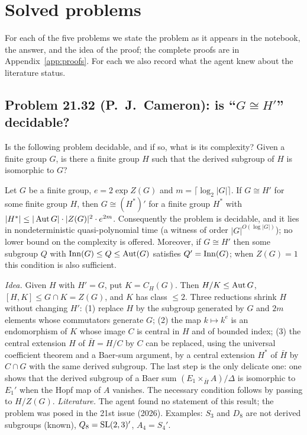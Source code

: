 \section{Solved problems}\label{sec:solved}

For each of the five problems we state the problem as it appears in the notebook, the answer, and the idea of the
proof; the complete proofs are in Appendix~\ref{app:proofs}. For each we also record what the agent knew about the
literature status.

\subsection{Problem 21.32 (P.~J.~Cameron): is ``$G\cong H'$'' decidable?}
\begin{problem}[21.32]
Is the following problem decidable, and if so, what is its complexity? Given a finite group $G$, is there a finite
group $H$ such that the derived subgroup of $H$ is isomorphic to $G$?
\end{problem}
\begin{theorem}\label{thm:2132}
Let $G$ be a finite group, $e=2\exp Z(G)$ and $m=\lceil\log_2|G|\rceil$. If $G\cong H'$ for some finite group $H$,
then $G\cong (H^*)'$ for a finite group $H^*$ with $|H^*|\le |\operatorname{Aut} G|\cdot|Z(G)|^2\cdot e^{2m}$. Consequently the
problem is decidable, and it lies in nondeterministic quasi-polynomial time (a witness of order $|G|^{O(\log|G|)}$);
no lower bound on the complexity is offered.
Moreover, if $G\cong H'$ then some subgroup $Q$ with $\operatorname{Inn}(G)\le Q\le\operatorname{Aut}(G)$ satisfies $Q'=\operatorname{Inn}(G)$; when
$Z(G)=1$ this condition is also sufficient.
\end{theorem}
\emph{Idea.} Given $H$ with $H'=G$, put $K=C_H(G)$. Then $H/K\le\operatorname{Aut} G$, $[H,K]\le G\cap K=Z(G)$, and $K$ has
class $\le 2$. Three reductions shrink $H$ without changing $H'$: (1) replace $H$ by the subgroup generated by
$G$ and $2m$ elements whose commutators generate $G$; (2) the map $k\mapsto k^e$ is an endomorphism of $K$ whose
image $C$ is central in $H$ and of bounded index; (3) the central extension $H$ of $\bar H=H/C$ by $C$ can be
replaced, using the universal coefficient theorem and a Baer-sum argument, by a central extension $H^*$ of $\bar H$
by $C\cap G$ with the same derived subgroup. The last step is the only delicate one: one shows that the derived
subgroup of a Baer sum $(E_1\times_{\bar H}A)/\Delta$ is isomorphic to $E_1'$ when the Hopf map of $A$ vanishes.
The necessary condition follows by passing to $H/Z(G)$. \emph{Literature.} The agent found no statement of this
result; the problem was posed in the 21st issue (2026). Examples: $S_3$ and $D_8$ are not derived subgroups
(known), $Q_8=\mathrm{SL}(2,3)'$, $A_4=S_4'$.

